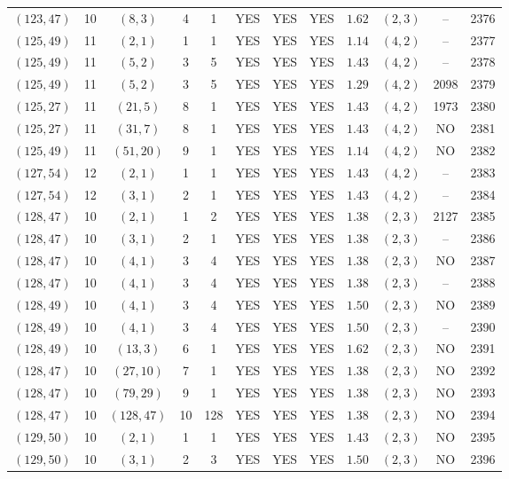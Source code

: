 \begin{longtable}{|c|c|c|c|c|c|c|c|c|c|c|c|}
$(123,47)$ & 10 & $(8,3)$ & 4 & 1 & YES & YES & YES & $1.62$ & $(2,3)$ & -- & 2376\\
$(125,49)$ & 11 & $(2,1)$ & 1 & 1 & YES & YES & YES & $1.14$ & $(4,2)$ & -- & 2377\\
$(125,49)$ & 11 & $(5,2)$ & 3 & 5 & YES & YES & YES & $1.43$ & $(4,2)$ & -- & 2378\\
$(125,49)$ & 11 & $(5,2)$ & 3 & 5 & YES & YES & YES & $1.29$ & $(4,2)$ & 2098 & 2379\\
$(125,27)$ & 11 & $(21,5)$ & 8 & 1 & YES & YES & YES & $1.43$ & $(4,2)$ & 1973 & 2380\\
$(125,27)$ & 11 & $(31,7)$ & 8 & 1 & YES & YES & YES & $1.43$ & $(4,2)$ & NO & 2381\\
$(125,49)$ & 11 & $(51,20)$ & 9 & 1 & YES & YES & YES & $1.14$ & $(4,2)$ & NO & 2382\\
$(127,54)$ & 12 & $(2,1)$ & 1 & 1 & YES & YES & YES & $1.43$ & $(4,2)$ & -- & 2383\\
$(127,54)$ & 12 & $(3,1)$ & 2 & 1 & YES & YES & YES & $1.43$ & $(4,2)$ & -- & 2384\\
$(128,47)$ & 10 & $(2,1)$ & 1 & 2 & YES & YES & YES & $1.38$ & $(2,3)$ & 2127 & 2385\\
$(128,47)$ & 10 & $(3,1)$ & 2 & 1 & YES & YES & YES & $1.38$ & $(2,3)$ & -- & 2386\\
$(128,47)$ & 10 & $(4,1)$ & 3 & 4 & YES & YES & YES & $1.38$ & $(2,3)$ & NO & 2387\\
$(128,47)$ & 10 & $(4,1)$ & 3 & 4 & YES & YES & YES & $1.38$ & $(2,3)$ & -- & 2388\\
$(128,49)$ & 10 & $(4,1)$ & 3 & 4 & YES & YES & YES & $1.50$ & $(2,3)$ & NO & 2389\\
$(128,49)$ & 10 & $(4,1)$ & 3 & 4 & YES & YES & YES & $1.50$ & $(2,3)$ & -- & 2390\\
$(128,49)$ & 10 & $(13,3)$ & 6 & 1 & YES & YES & YES & $1.62$ & $(2,3)$ & NO & 2391\\
$(128,47)$ & 10 & $(27,10)$ & 7 & 1 & YES & YES & YES & $1.38$ & $(2,3)$ & NO & 2392\\
$(128,47)$ & 10 & $(79,29)$ & 9 & 1 & YES & YES & YES & $1.38$ & $(2,3)$ & NO & 2393\\
$(128,47)$ & 10 & $(128,47)$ & 10 & 128 & YES & YES & YES & $1.38$ & $(2,3)$ & NO & 2394\\
$(129,50)$ & 10 & $(2,1)$ & 1 & 1 & YES & YES & YES & $1.43$ & $(2,3)$ & NO & 2395\\
$(129,50)$ & 10 & $(3,1)$ & 2 & 3 & YES & YES & YES & $1.50$ & $(2,3)$ & NO & 2396\\

\end{longtable}

